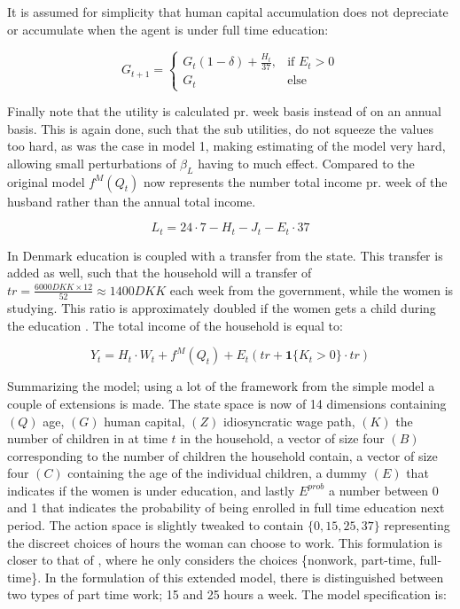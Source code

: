 It is assumed for simplicity that human capital accumulation does not depreciate or accumulate when the agent is under full time education:

\begin{equation}
    G_{t+1} = 
    \begin{cases}
        G_t(1 - \delta) + \frac{H_t}{37}, & \text{if } E_t > 0 \\
        G_t & \text{else}
    \end{cases}
\end{equation}


Finally note that the utility is calculated pr. week basis instead of on an annual basis. This is again done, such that the sub utilities, do not squeeze the values too hard, as was the case in model 1, making estimating of the model very hard, allowing small perturbations of $\beta_L$ having to much effect. Compared to the original model $f^M(Q_t)$ now represents the number total income pr. week of the husband rather than the annual total income.

\begin{equation}
    L_t = 24 \cdot 7 - H_t - J_t - E_t \cdot 37
\end{equation}

In Denmark education is coupled with a transfer from the state. This transfer is added as well, such that the household will a transfer of $tr = \frac{6000 DKK \times 12}{52} \approx 1400 DKK$ each week from the government, while the women is studying. This ratio is approximately doubled if the women gets a child during the education \parencite{noauthor_satser_nodate-1}. The total income of the household is equal to:

\begin{equation}
    Y_t = H_t \cdot W_t + f^M(Q_t) + E_t (tr + \mathbf{1} \{ K_t > 0 \} \cdot tr)  
\end{equation}


Summarizing the model; using a lot of the framework from the simple model a couple of extensions is made. The state space is now of 14 dimensions containing $(Q)$ age, $(G)$ human capital, $(Z)$ idiosyncratic wage path, $(K)$ the number of children in at time $t$ in the household, a vector of size four $(B)$ corresponding to the number of children the household contain, a vector of size four $(C)$ containing the age of the individual children, a dummy $(E)$ that indicates if the women is under education, and lastly $E^{prob}$ a number between 0 and 1 that indicates the probability of being enrolled in full time education next period. The action space is slightly tweaked to contain $\{ 0, 15, 25, 37\}$ representing the discreet choices of hours the woman can choose to work. This formulation is closer to that of \textcite{francesconi_joint_2002}, where he only considers the choices \{nonwork, part-time, full-time\}. In the formulation of this extended model, there is distinguished between two types of part time work; 15 and 25 hours a week. The model specification is:

